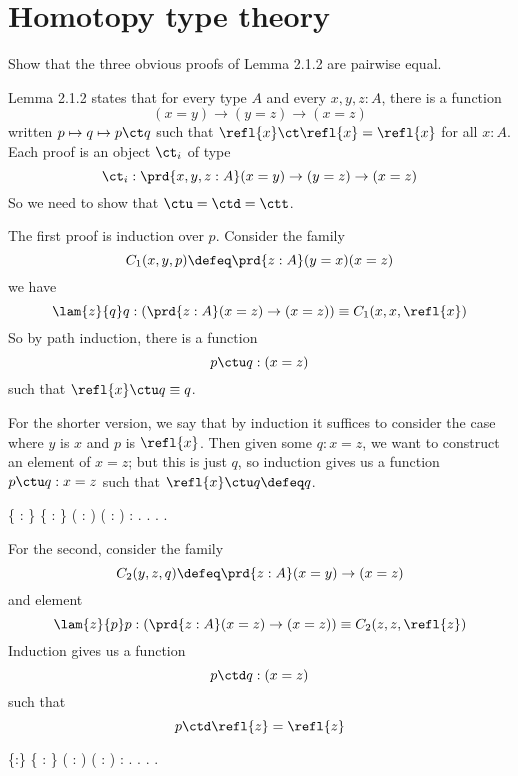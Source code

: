 \begin{coqdoccode}
\end{coqdoccode}
\section{Homotopy type theory}



Show that the three obvious proofs of Lemma 2.1.2 are pairwise equal.
 

 \soln
Lemma 2.1.2 states that for every type $A$ and every $x, y, z : A$, there is a
function
\[
  (x = y) \to (y = z) \to (x = z)
\]
written $p \mapsto q \mapsto p \ct q$ such that $\refl{x} \ct \refl{x} =
\refl{x}$ for all $x : A$.  Each proof is an object $\ct_{i}$ of type
\[
  \ct_{i} : \prd{x,y,z:A} (x=y)\to(y=z)\to(x=z)
\]
So we need to show that $\ctu = \ctd = \ctt$.


The first proof is induction over $p$.  Consider the family
\[
  C_{1}(x, y, p) \defeq 
  \prd{z:A} (y=x) (x=z)
\]
we have
\[
\lam{z}{q}q :
\left(\prd{z:A} (x=z) \to (x=z)\right)
  \equiv
  C_{1}(x, x, \refl{x})
\]
So by path induction, there is a function
\[
  p \ctu q : (x=z)
\]
such that $\refl{x} \ctu q \equiv q$. 


For the shorter version, we say that by induction it suffices to consider the
case where $y$ is $x$ and $p$ is $\refl{x}$.  Then given some $q : x = z$, we
want to construct an element of $x=z$; but this is just $q$, so induction gives
us a function $p \ctu q : x = z$ such that $\refl{x} \ctu q \defeq q$.
\begin{coqdoccode}
\coqdocemptyline
\coqdocnoindent
{}  \{ : \} \{   : \} ( :  \coqdocnotation{=} ) ( :  \coqdocnotation{=} ) :  \coqdocnotation{=} .\coqdoceol
\coqdocindent{1.00em}
 .  .\coqdoceol
\coqdocnoindent
{}.\coqdoceol
\coqdocemptyline
\end{coqdoccode}
For the second, consider the family
\[
  C_{2}(y, z, q) \defeq 
  \prd{z:A} (x=y) \to (x=z)
\]
and element
\[
  \lam{z}{p}p
  :
  \left(
    \prd{z:A} (x=z)\to (x=z)
  \right)
  \equiv
  C_{2}(z,z,\refl{z})
\]
Induction gives us a function
\[
  p \ctd q : (x = z)
\]
such that
\[
  p \ctd \refl{z} = \refl{z}
\] \begin{coqdoccode}
\coqdocnoindent
{}  \{:\} \{   : \} ( :  \coqdocnotation{=} ) ( :  \coqdocnotation{=} ) :  \coqdocnotation{=} .\coqdoceol
\coqdocindent{1.00em}
 .  .\coqdoceol
\coqdocnoindent
{}.\coqdoceol
\coqdocemptyline
\end{coqdoccode}


